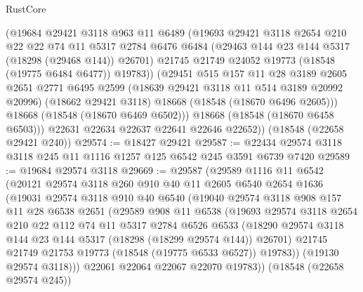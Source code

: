 \begin{lexlean}{RustCore}
\begin{coremodule}
            (@19684
              @29421
              @3118
              @963
              @11
              @6489
              (@19693
                @29421
                @3118
                @2654
                @210
                @22
                @22
                @74
                @11
                @5317
                @2784
                @6476
                @6484
                (@29463 @144 @23 @144 @5317 (@18298 (@29468 @144)) @26701)
                @21745
                @21749
                @24052
                @19773
                (@18548 (@19775 @6484 @6477))
                @19783))
            (@29451
              @515
              @157
              @11
              @28
              @3189
              @2605
              @2651
              @2771
              @6495
              @2599
              (@18639 @29421 @3118 @11 @514 @3189 @20992 @20996)
              (@18662 @29421 @3118)
              @18668
              (@18548 (@18670 @6496 @2605)))
            @18668
            (@18548 (@18670 @6469 @6502)))
          @18668
          (@18548 (@18670 @6458 @6503)))
        @22631
        @22634
        @22637
        @22641
        @22646
        @22652))
    (@18548 (@22658 @29421 @240))
@29574 := @18427 @29421
@29587 := @22434 @29574 @3118 @3118 @245 @11 @1116 @1257 @125 @6542 @245 @3591 @6739 @7420
@29589 := @19684 @29574 @3118
@29669 := @29587
    (@29589
      @1116
      @11
      @6542
      (@20121
        @29574
        @3118
        @260
        @910
        @40
        @11
        @2605
        @6540
        @2654
        @1636
        (@19031
          @29574
          @3118
          @910
          @40
          @6540
          (@19040
            @29574
            @3118
            @908
            @157
            @11
            @28
            @6538
            @2651
            (@29589
              @908
              @11
              @6538
              (@19693
                @29574
                @3118
                @2654
                @210
                @22
                @112
                @74
                @11
                @5317
                @2784
                @6526
                @6533
                (@18290 @29574 @3118 @144 @23 @144 @5317 (@18298 (@18299 @29574 @144)) @26701)
                @21745
                @21749
                @21753
                @19773
                (@18548 (@19775 @6533 @6527))
                @19783))
            (@19130 @29574 @3118)))
        @22061
        @22064
        @22067
        @22070
        @19783))
    (@18548 (@22658 @29574 @245))

\end{coremodule}
\end{lexlean}
